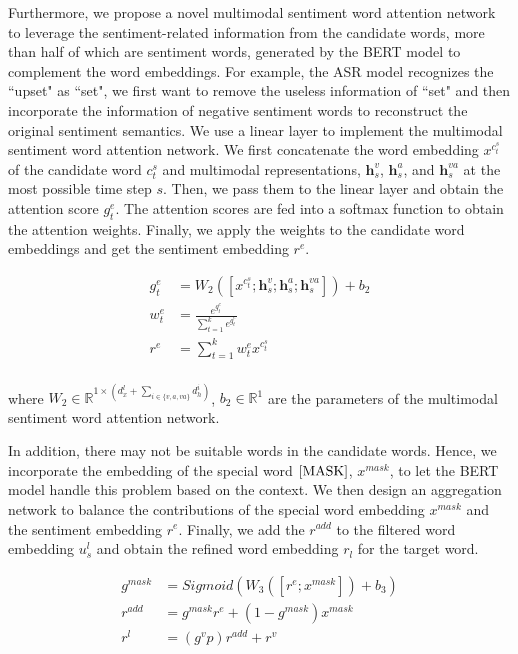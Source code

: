\documentclass[11pt]{article}
\begin{document}
Furthermore, we propose a novel multimodal sentiment word attention network to leverage the sentiment-related information from the candidate words, more than half of which are sentiment words, generated by the BERT model to complement the word embeddings. For example, the ASR model recognizes the ``upset" as ``set", we first want to remove the useless information of ``set" and then incorporate the information of negative sentiment words to reconstruct the original sentiment semantics. We use a linear layer to implement the multimodal sentiment word attention network. We first concatenate the word embedding $x^{c_t^s}$ of the candidate word $c_t^s$ and multimodal representations, $\mathbf h_{s}^v$, $\mathbf h_{s}^a$, and $\mathbf h_{s}^{va}$ at the most possible time step $s$. Then, we pass them to the linear layer and obtain the attention score $g_t^e$. The attention scores are fed into a softmax function to obtain the attention weights. Finally, we apply the weights to the candidate word embeddings and get the sentiment embedding $r^e$.


\begin{equation}
\begin{aligned}
g_t^e &= W_2([  x^{c_t^s}; \mathbf h_{s}^v; \mathbf h_{s}^a; \mathbf h_{s}^{va}]) + b_2 \\
w_{t}^{e} &=  \frac{e^{g_{t}^{e}}}{\sum_{t=1}^{k}{e^{g_{t}^{e}}}} \\
r^e &= \sum_{t=1}^{k} w_t^{e}x^{c_t^s} \\
\end{aligned}
\end{equation}

where $W_{2} \in \mathbb R^{1 \times (d_x^l + \sum_{i \in \{v, a, va\}} d^i_h)}$, $b_2 \in \mathbb R^1$ are the parameters of the multimodal sentiment word attention network.

In addition, there may not be suitable words in the candidate words. Hence, we incorporate the embedding of the special word $[\rm MASK]$, $x^{mask}$, to let the BERT model handle this problem based on the context. We then design an aggregation network to balance the contributions of the special word embedding $x^{mask}$ and the sentiment embedding $r^e$. Finally, we add the $r^{add}$ to the filtered word embedding $u_s^l$ and obtain the refined word embedding $r_l$ for the target word.  

\begin{equation}
\begin{aligned}
g^{mask} &= Sigmoid(W_3([r^e; x^{mask}]) + b_3) \\
r^{add} &= g^{mask} r^e + (1-g^{mask}) x^{mask} \\
 r^l &= (g^v p) r^{add} + r^v
\end{aligned}
\end{equation}
\end{document}

